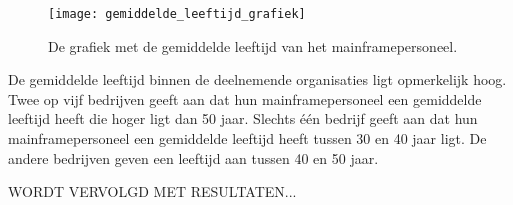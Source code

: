  \subsubsection{}
\label{sec:Wat is de gemiddelde leeftijd van het mainframepersoneel?}

\begin{figure}[h]
    \centering
    \texttt{[image: gemiddelde\_leeftijd\_grafiek]}
    \caption{De grafiek met de gemiddelde leeftijd van het mainframepersoneel.}
\end{figure}


De gemiddelde leeftijd binnen de deelnemende organisaties ligt opmerkelijk hoog. Twee op vijf bedrijven geeft aan dat hun mainframepersoneel een gemiddelde leeftijd heeft die hoger ligt dan 50 jaar. Slechts één bedrijf geeft aan dat hun mainframepersoneel een gemiddelde leeftijd heeft tussen 30 en 40 jaar ligt. De andere bedrijven geven een leeftijd aan tussen 40 en 50 jaar. 

WORDT VERVOLGD MET RESULTATEN... 




